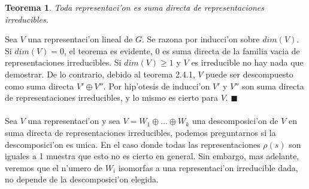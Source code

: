 \documentclass[a4paper,openright,12pt]{book}
\numberwithin{equation}{section} %
\newtheorem{teorema}{Teorema}[section] %
\newenvironment{proof}{\noindent{\it Demostracion:}}{\hfill$\blacksquare$} %
\begin{document}
\begin{teorema}
Toda representaci'on es suma directa de representaciones irreducibles.
\end{teorema} 
\begin{proof}
Sea $V$ una representaci'on lineal de $G$. Se razona por inducci'on sobre $dim(V)$. Si $dim(V)=0$, el teorema es evidente, 0 es suma directa de la familia vacia de representaciones irreducibles. Si $dim(V)\geq 1$ y $V$ es irreducible no hay nada que demostrar. De lo contrario, debido al teorema 2.4.1, $V$ puede ser descompuesto como suma directa $V' \oplus V''$. Por hip'otesis de inducci'on $V'$ y $V''$ son suma directa de representaciones irreducibles, y lo mismo es cierto para $V$. 
\end{proof}\\
\\
Sea $V$ una representaci'on y sea $V=W_{1}\oplus \ldots \oplus W_{k}$ una descomposici'on de $V$ en suma directa de representaciones irreducibles, podemos preguntarnos si la descomposici'on es unica. En el caso donde todas las representaciones $\rho (s)$ son iguales a 1 muestra que esto no es cierto en general. Sin embargo, mas adelante, veremos que el n'umero de $W_{i}$ isomorfas a una representaci'on irreducible dada, no depende de la descomposici'on elegida. 
\end{document}
